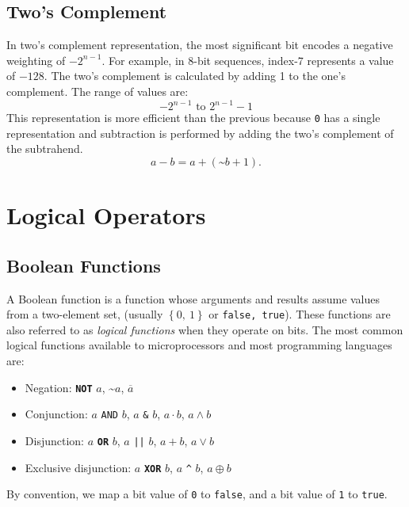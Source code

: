 \documentclass[a4paper]{report}
\newcommand{\keywordinline}[1]{\textcolor[rgb]{0.00,0.50,0.00}{\textbf{\texttt{#1}}}}
\begin{document}
\subsection{Two's Complement}
In two's complement representation, the most significant bit encodes a negative weighting of
\(-2^{n - 1}\). For example, in 8-bit sequences, index-7 represents a value of \(-128\).
The two's complement is calculated by adding 1 to the one's complement.
The range of values are:
\begin{equation*}
    -2^{n - 1} \text{ to } 2^{n - 1} - 1
\end{equation*}
This representation is more efficient than the previous because \texttt{0} has a single representation
and subtraction is performed by adding the two's complement of the subtrahend.
\begin{equation*}
    a - b = a + \left( \text{\textasciitilde} b + 1 \right).
\end{equation*}
\section{Logical Operators}
\subsection{Boolean Functions}
A Boolean function is a function whose arguments and results assume values
from a two-element set, (usually \(\left\{ 0,\: 1 \right\}\) or \texttt{{false, true}}).
These functions are also referred to as \textit{logical functions} when they operate on bits.
The most common logical functions available to microprocessors and most programming languages are:
\begin{itemize}
    \item Negation: \keywordinline{NOT} \(a\), \textasciitilde\(a\), \(\overline{a}\)
    \item Conjunction: \(a\) \texttt{AND} \(b\), \(a\) \texttt{&} \(b\), \(a \cdot b\), \(a \land b\)
    \item Disjunction: \(a\) \keywordinline{OR} \(b\), \(a\) \texttt{|\vert|} \(b\), \(a + b\), \(a \lor b\)
    \item Exclusive disjunction: \(a\) \keywordinline{XOR} \(b\), \(a\) \texttt{^} \(b\), \(a \oplus b\)
\end{itemize}
By convention, we map a bit value of \texttt{0} to \texttt{false}, and a bit value of \texttt{1} to \texttt{true}.
\end{document}
